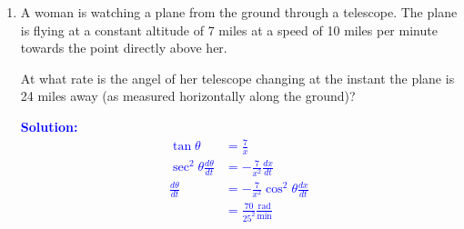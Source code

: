 \documentclass[letterpaper,11pt]{article}
\newcommand{\sol}[2]{\begin{minipage}[c][#1]{\linewidth}{\textcolor{blue}{\textbf{Solution:}}\quad \textcolor{blue}{#2}}\end{minipage}}
\newcommand{\sol}[2]{\begin{minipage}[c][#1]{\linewidth}{\vfill}\end{minipage}}
\begin{document}
\begin{enumerate}
\item A woman is watching a plane from the ground through a telescope. The plane is flying at a constant altitude of 7 miles at a speed of 10 miles per minute towards the point directly above her.

At what rate is the angel of her telescope changing at the instant the plane is 24 miles away (as measured horizontally along the ground)?

\sol{}{\begin{align*}
    \tan{\theta} & = \frac{7}{x} \\
    \sec^2{\theta} \frac{d\theta}{dt} & = -\frac{7}{x^2} \frac{dx}{dt}\\
    \frac{d\theta}{dt} & = -\frac{7}{x^2} \cos^2{\theta} \frac{dx}{dt}\\
    & = \frac{70}{25^2} \frac{\text{rad}}{\text{min}}
\end{align*}}
\end{enumerate}
\end{document}
